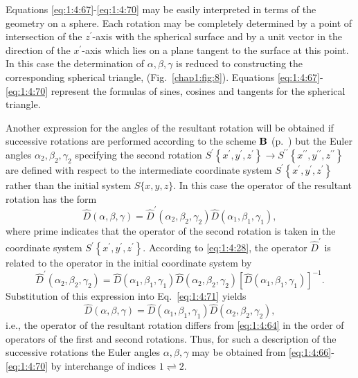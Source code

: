 Equations \eqref{eq:1:4:67}-\eqref{eq:1:4:70} may be easily interpreted in terms of the geometry on a sphere. Each rotation may be completely determined by a point of intersection of the \(z^{\prime}\)-axis with the spherical surface and by a unit vector in the direction of the \(x^{\prime}\)-axis which lies on a plane tangent to the surface at this point. In this case the determination of \(\alpha, \beta, \gamma\) is reduced to constructing the corresponding spherical triangle, (Fig.~\ref{chap1:fig:8}). Equations \eqref{eq:1:4:67}-\eqref{eq:1:4:70} represent the formulas of sines, cosines and tangents for the spherical triangle.

Another expression for the angles of the resultant rotation will be obtained if successive rotations are performed according to the scheme \(\mathbf{B}\) (p.~\pageref{schemeB}) but the Euler angles \(\alpha_{2}, \beta_{2}, \gamma_{2}\) specifying the second rotation \(S^{\prime}\left\{x^{\prime}, y^{\prime}, z^{\prime}\right\} \rightarrow S^{\prime \prime}\left\{x^{\prime \prime}, y^{\prime \prime}, z^{\prime \prime}\right\}\) are defined with respect to the intermediate coordinate system \(S^{\prime}\left\{x^{\prime}, y^{\prime}, z^{\prime}\right\}\) rather than the initial system \(S\{x, y, z\}\). In this case the operator of the resultant rotation has the form
\begin{equation}
\widehat{D}(\alpha, \beta, \gamma)=\widehat{D}^{\prime}\left(\alpha_{2}, \beta_{2}, \gamma_{2}\right) \widehat{D}\left(\alpha_{1}, \beta_{1}, \gamma_{1}\right), \label{eq:1:4:71}
\end{equation}
where prime indicates that the operator of the second rotation is taken in the coordinate system \(S^{\prime}\left\{x^{\prime}, y^{\prime}, z^{\prime}\right\}\). According to \eqref{eq:1:4:28}, the operator \(\widehat{D}^{\prime}\) is related to the operator in the initial coordinate system by
\begin{equation}
\widehat{D}^{\prime}\left(\alpha_{2}, \beta_{2}, \gamma_{2}\right)=\widehat{D}\left(\alpha_{1}, \beta_{1}, \gamma_{1}\right) \widehat{D}\left(\alpha_{2}, \beta_{2}, \gamma_{2}\right)\left[\widehat{D}\left(\alpha_{1}, \beta_{1}, \gamma_{1}\right)\right]^{-1} . \label{eq:1:4:72}
\end{equation}
Substitution of this expression into Eq.~\eqref{eq:1:4:71} yields
\begin{equation}
\widehat{D}(\alpha, \beta, \gamma)=\widehat{D}\left(\alpha_{1}, \beta_{1}, \gamma_{1}\right) \widehat{D}\left(\alpha_{2}, \beta_{2}, \gamma_{2}\right), \label{eq:1:4:73}
\end{equation}
i.e., the operator of the resultant rotation differs from \eqref{eq:1:4:64} in the order of operators of the first and second rotations. Thus, for such a description of the successive rotations the Euler angles \(\alpha, \beta, \gamma\) may be obtained from \eqref{eq:1:4:66}-\eqref{eq:1:4:70} by interchange of indices \(1 \rightleftharpoons 2\).

